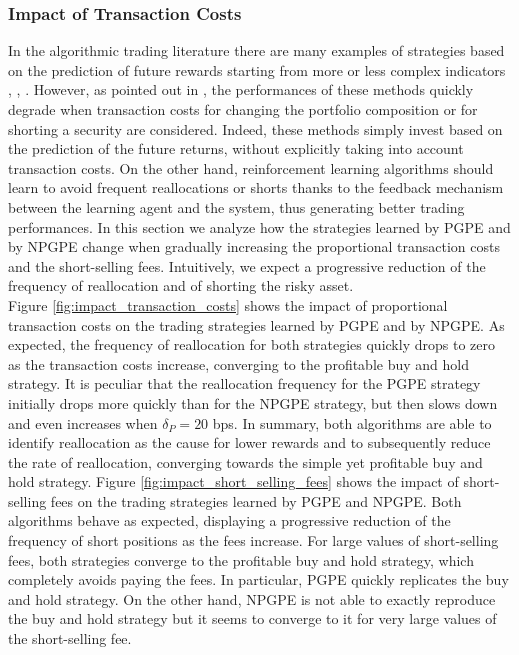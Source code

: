 \subsubsection{Impact of Transaction Costs}
In the algorithmic trading literature there are many examples of strategies based on the prediction of future rewards starting from more or less complex indicators \cite{kamijo1990stock}, \cite{saad1998comparative}, \cite{liang2011stock}. However, as pointed out in \cite{deng2016deep}, the performances of these methods quickly degrade when transaction costs for changing the portfolio composition or for shorting a security
are considered. Indeed, these methods simply invest based on the prediction of the future returns, without explicitly taking into account transaction costs. On the other hand, reinforcement learning algorithms should learn to avoid frequent reallocations or shorts thanks to the feedback mechanism between the learning agent and the system, thus generating better trading performances. In this section we analyze how the strategies learned by PGPE and by NPGPE change when gradually increasing the proportional transaction costs and the short-selling fees. Intuitively, we expect a progressive reduction of the frequency of reallocation and of shorting the risky asset.\\
Figure \ref{fig:impact_transaction_costs} shows the impact of proportional transaction costs on the trading strategies learned by PGPE and by NPGPE. As expected, the frequency of reallocation for both strategies quickly drops to zero as the transaction costs increase, converging to the profitable buy and hold strategy. It is peculiar that the reallocation frequency for the PGPE strategy initially drops more quickly than for the NPGPE strategy, but then slows down and even increases when $\delta_P = 20$ bps.
In summary, both algorithms are able to identify reallocation as the cause for lower rewards and to subsequently reduce the rate of reallocation, converging towards the simple yet profitable buy and hold strategy. Figure \ref{fig:impact_short_selling_fees} shows the impact of short-selling fees on the trading strategies learned by PGPE and NPGPE. Both algorithms behave as expected, displaying a progressive reduction of the frequency of short positions as the fees increase. For large values of short-selling fees, both strategies converge to the profitable buy and hold strategy, which completely avoids paying the fees. In particular, PGPE quickly replicates the buy and hold strategy. On the other hand, NPGPE is not able to exactly reproduce the buy and hold strategy but it seems to converge to it for very large values of the short-selling fee. 
